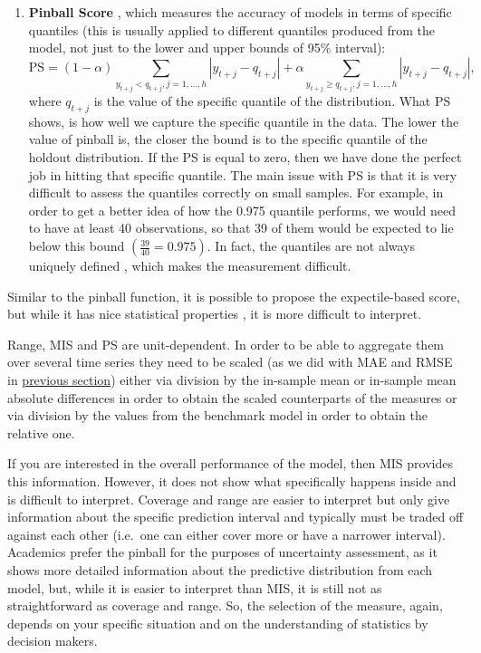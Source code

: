 \documentclass[
]{book}
\theoremstyle{definition}
\theoremstyle{definition}
\theoremstyle{definition}
\theoremstyle{definition}
\theoremstyle{remark}
\begin{document}
\begin{enumerate}
\item
  \textbf{Pinball Score} \citep{Koenker1978}, which measures the accuracy of models in terms of specific quantiles (this is usually applied to different quantiles produced from the model, not just to the lower and upper bounds of 95\% interval):
  \begin{equation}
   \mathrm{PS} = (1 -\alpha) \sum_{y_{t+j} < q_{t+j}, j=1,\dots,h } |y_{t+j} -q_{t+j}| + \alpha \sum_{y_{t+j} \geq q_{t+j} , j=1,\dots,h } |y_{t+j} -q_{t+j}|,
   \label{eq:pinball}
  \end{equation}
  where \(q_{t+j}\) is the value of the specific quantile of the distribution. What PS shows, is how well we capture the specific quantile in the data. The lower the value of pinball is, the closer the bound is to the specific quantile of the holdout distribution. If the PS is equal to zero, then we have done the perfect job in hitting that specific quantile. The main issue with PS is that it is very difficult to assess the quantiles correctly on small samples. For example, in order to get a better idea of how the 0.975 quantile performs, we would need to have at least 40 observations, so that 39 of them would be expected to lie below this bound \(\left(\frac{39}{40} = 0.975\right)\). In fact, the quantiles are not always uniquely defined \citep[see, for example,][]{Taylor2020}, which makes the measurement difficult.
\end{enumerate}

Similar to the pinball function, it is possible to propose the expectile-based score, but while it has nice statistical properties \citep{Taylor2020}, it is more difficult to interpret.

Range, MIS and PS are unit-dependent. In order to be able to aggregate them over several time series they need to be scaled (as we did with MAE and RMSE in \protect\hyperlink{errorMeasures}{previous section}) either via division by the in-sample mean or in-sample mean absolute differences in order to obtain the scaled counterparts of the measures or via division by the values from the benchmark model in order to obtain the relative one.

If you are interested in the overall performance of the model, then MIS provides this information. However, it does not show what specifically happens inside and is difficult to interpret. Coverage and range are easier to interpret but only give information about the specific prediction interval and typically must be traded off against each other (i.e.~one can either cover more or have a narrower interval). Academics prefer the pinball for the purposes of uncertainty assessment, as it shows more detailed information about the predictive distribution from each model, but, while it is easier to interpret than MIS, it is still not as straightforward as coverage and range. So, the selection of the measure, again, depends on your specific situation and on the understanding of statistics by decision makers.
\end{document}
